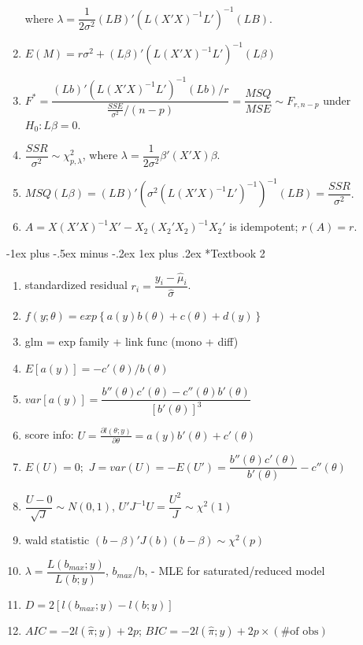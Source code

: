\documentclass[10pt,landscape]{article}
\makeatletter
\renewcommand{\subsubsection}{\@startsection{subsubsection}{3}{0mm}%
                                {-1ex plus -.5ex minus -.2ex}%
                                {1ex plus .2ex}%
                                {\normalfont\small\bfseries}}
\makeatother
\begin{document}
\begin{multicols}{3}
\begin{enumerate}
where $\lambda=\dfrac{1}{2\sigma^{2}}\left(LB\right)'\left(L\left(X'X\right)^{-1}L'\right)^{-1}\left(LB\right)$.
\item $E\left(M\right)=r\sigma^{2}+\left(L\beta\right)'\left(L\left(X'X\right)^{-1}L'\right)^{-1}\left(L\beta\right)$
\item $F^{*}=\dfrac{\left(Lb\right)'\left(L\left(X'X\right)^{-1}L'\right)^{-1}\left(Lb\right)/r}{\frac{SSE}{\sigma^{2}}/\left(n-p\right)}=\dfrac{MSQ}{MSE}\sim F_{r,n-p}$
under $H_{0}:L\beta=0$.
\item $\dfrac{SSR}{\sigma^{2}}\sim\chi_{p,\lambda}^{2}$, where $\lambda=\dfrac{1}{2\sigma^{2}}\beta'\left(X'X\right)\beta$.
\item $MSQ\left(L\beta\right)=\left(LB\right)'\left(\sigma^{2}\left(L\left(X'X\right)^{-1}L'\right)^{-1}\right)^{-1}\left(LB\right)=\dfrac{SSR}{\sigma^{2}}$.
\item $A=X\left(X'X\right)^{-1}X'-X_{2}\left(X_{2}'X_{2}\right)^{-1}X_{2}'$
is idempotent; $r\left(A\right)=r$.
\end{enumerate}

\subsubsection*{Textbook 2}
\begin{enumerate}
\item standardized residual $r_{i}=\dfrac{y_{i}-\hat{\mu}_{i}}{\hat{\sigma}}$.
\item $f\left(y;\theta\right)=exp\left\{ a\left(y\right)b\left(\theta\right)+c\left(\theta\right)+d\left(y\right)\right\} $
\item glm = exp family + link func (mono + diff)
\item $E\left[a\left(y\right)\right]=-c'\left(\theta\right)/b\left(\theta\right)$
\item $var\left[a\left(y\right)\right]=\dfrac{b''\left(\theta\right)c'\left(\theta\right)-c''\left(\theta\right)b'\left(\theta\right)}{\left[b'\left(\theta\right)\right]^{3}}$
\item score info: $U=\frac{\partial l\left(\theta;y\right)}{\partial\theta}=a\left(y\right)b'\left(\theta\right)+c'\left(\theta\right)$
\item $E\left(U\right)=0;$ $J=var\left(U\right)=-E\left(U'\right)=\dfrac{b''\left(\theta\right)c'\left(\theta\right)}{b'\left(\theta\right)}-c''\left(\theta\right)$
\item $\dfrac{U-0}{\sqrt{J}}\sim N\left(0,1\right)$, $U'J^{-1}U=\dfrac{U^{2}}{J}\sim\chi^{2}\left(1\right)$
\item wald statistic $\left(b-\beta\right)'J\left(b\right)\left(b-\beta\right)\sim\chi^{2}\left(p\right)$
\item $\lambda=\dfrac{L\left(b_{max};y\right)}{L\left(b;y\right)}$, $b_{max}$/b,
- MLE for saturated/reduced model
\item $D=2\left[l\left(b_{max};y\right)-l\left(b;y\right)\right]$
\item $AIC=-2l\left(\hat{\pi};y\right)+2p$; $BIC=-2l\left(\hat{\pi};y\right)+2p\times\left(\#\text{of obs}\right)$\end{enumerate}

\end{multicols}
\end{document}

